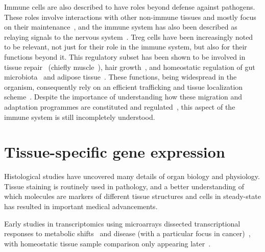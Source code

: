 Immune cells are also described to have roles beyond defense against pathogens. These roles involve interactions with other non-immune tissues and mostly focus on their maintenance~\citep{gordon_physiological_2017,laurent_immune-mediated_2017}, and the immune system has also been described as relaying signals to the nervous system~\citep{veiga-fernandes_neuro-immune_2016}. Treg cells have been increasingly noted to be relevant, not just for their role in the immune system, but also for their functions beyond it. This regulatory subset has been shown to be involved in tissue repair~\citep{li_regulatory_2018} (chiefly muscle~\citep{burzyn_special_2013}), hair growth~\citep{ali_regulatory_2017}, and homeostatic regulation of gut microbiota~\citep{cebula_thymus-derived_2013} and adipose tissue~\citep{cipolletta_adipose_2014,sharma_emerging_2018}. These functions, being widespread in the organism, consequently rely on an efficient trafficking and tissue localization scheme~\citep{liston_homeostatic_2014}. Despite the importance of understanding how these migration and adaptation programmes are constituted and regulated~\citep{agace_tissue-tropic_2006}, this aspect of the immune system is still incompletely understood.



\section{Tissue-specific gene expression}  %
\label{section1.5}

Histological studies have uncovered many details of organ biology and physiology. Tissue staining is routinely used in pathology, and a better understanding of which molecules are markers of different tissue structures and cells in steady-state has resulted in important medical advancements.

Early studies in transcriptomics using microarrays dissected transcriptional responses to metabolic shifts~\citep{derisi_exploring_1997} and disease (with a particular focus in cancer)~\citep{rhodes_large-scale_2004}, with homeostatic tissue sample comparison only appearing later~\citep{shyamsundar_dna_2005}. 

